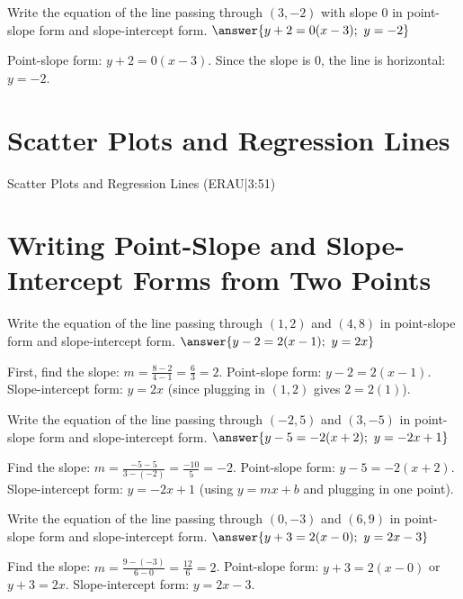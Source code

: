 \documentclass{ximera}
\begin{document}
\begin{problem}
Write the equation of the line passing through $(3, -2)$ with slope $0$ in point-slope form and slope-intercept form. $\answer{y + 2 = 0(x - 3);\ y = -2}$
\begin{feedback}
Point-slope form: $y + 2 = 0(x - 3)$. Since the slope is $0$, the line is horizontal: $y = -2$.
\end{feedback}
\end{problem}





\section*{Scatter Plots and Regression Lines}

Scatter Plots and Regression Lines (ERAU|3:51)



\section*{Writing Point-Slope and Slope-Intercept Forms from Two Points}

\begin{problem}
Write the equation of the line passing through $(1, 2)$ and $(4, 8)$ in point-slope form and slope-intercept form. $\answer{y - 2 = 2(x - 1);\ y = 2x}$ 
\begin{feedback}
First, find the slope: $m = \frac{8 - 2}{4 - 1} = \frac{6}{3} = 2$.  
Point-slope form: $y - 2 = 2(x - 1)$.  
Slope-intercept form: $y = 2x$ (since plugging in $(1, 2)$ gives $2 = 2(1)$).
\end{feedback}
\end{problem}

\begin{problem}
Write the equation of the line passing through $(-2, 5)$ and $(3, -5)$ in point-slope form and slope-intercept form. $\answer{y - 5 = -2(x + 2);\ y = -2x + 1}$
\begin{feedback}
Find the slope: $m = \frac{-5 - 5}{3 - (-2)} = \frac{-10}{5} = -2$.  
Point-slope form: $y - 5 = -2(x + 2)$.  
Slope-intercept form: $y = -2x + 1$ (using $y = mx + b$ and plugging in one point).
\end{feedback}
\end{problem}

\begin{problem}
Write the equation of the line passing through $(0, -3)$ and $(6, 9)$ in point-slope form and slope-intercept form. $\answer{y + 3 = 2(x - 0);\ y = 2x - 3}$
\begin{feedback}
Find the slope: $m = \frac{9 - (-3)}{6 - 0} = \frac{12}{6} = 2$.  
Point-slope form: $y + 3 = 2(x - 0)$ or $y + 3 = 2x$.  
Slope-intercept form: $y = 2x - 3$.
\end{feedback}
\end{problem}

\end{document}
